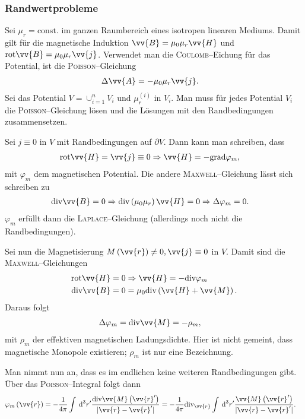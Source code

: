\documentclass[a4paper,12pt]{article}
\newcommand{\td}{\,\text{d}}
\numberwithin{equation}{section}
\begin{document}
\subsubsection{Randwertprobleme}
Sei $\mu _r=\text{const.}$ im ganzen Raumbereich eines isotropen linearen Mediums.
Damit gilt für die magnetische Induktion $\vv{B}=\mu _0\mu _r\vv{H}$ und $\text{rot}\vv{B}=\mu _0\mu _r\vv{j}$.
Verwendet man die \textsc{Coulomb}--Eichung für das Potential, ist die \textsc{Poisson}--Gleichung
\begin{align} 
        \Delta \vv{A}&=-\mu _0\mu _r\vv{j}
.\end{align} 
Sei das Potential $V=\cup _{i=1}^nV_i$ und $\mu _r^{\left(i\right)}$ in $V_i$. 
Man muss für jedes Potential $V_i$ die \textsc{Poisson}--Gleichung lösen und die Lösungen mit den Randbedingungen zusammensetzen.\par
Sei $j\equiv 0$ in $V$ mit Randbedingungen auf $\partial V$. 
Dann kann man schreiben, dass
\begin{align} 
        \text{rot}\vv{H}&=\vv{j}\equiv0\Rightarrow \vv{H}=-\text{grad}\varphi _m
,\end{align} 
mit $\varphi _m$ dem magnetischen Potential.
Die andere \textsc{Maxwell}--Gleichung lässt sich schreiben zu
\begin{align} 
        \text{div}\vv{B}&=0\Rightarrow \text{div}\left(\mu _0\mu _r\right)\vv{H}=0\Rightarrow \Delta \varphi _m=0
.\end{align} 
$\varphi _m$ erfüllt dann die \textsc{Laplace}--Gleichung (allerdings noch nicht die Randbedingungen).\par
Sei nun die Magnetisierung $M\left(\vv{r}\right)\neq 0,\vv{j}\equiv0 $ in $V$. Damit sind die \textsc{Maxwell}--Gleichungen
\begin{align} 
        \text{rot}\vv{H}&=0\Rightarrow \vv{H}=-\text{div}\varphi _m\\
        \text{div}\vv{B}&=0=\mu _0\text{div}\left(\vv{H}+\vv{M}\right)
.\end{align} 
Daraus folgt
\begin{align} 
        \Delta \varphi _m&=\text{div}\vv{M}=-\rho _m
,\end{align} 
mit $\rho _m$ der effektiven magnetischen Ladungsdichte. 
Hier ist nicht gemeint, dass magnetische Monopole existieren; $\rho _m$ ist nur eine Bezeichnung.\par
Man nimmt nun an, dass es im endlichen keine weiteren Randbedingungen gibt.
Über das \textsc{Poisson}--Integral folgt dann
\begin{align} 
        \varphi _m\left(\vv{r}\right)&=-\dfrac{1}{4\pi }\int_{}^{}\td ^3r'\dfrac{\text{div}\vv{M}\left(\vv{r}'\right)}{|\vv{r}-\vv{r}'|}=-\dfrac{1}{4\pi }\text{div}_{\vv{r}}\int_{}^{}\td ^3r'\dfrac{\vv{M}\left(\vv{r}'\right)}{|\vv{r}-\vv{r}'|}
.\end{align} 
\end{document}
